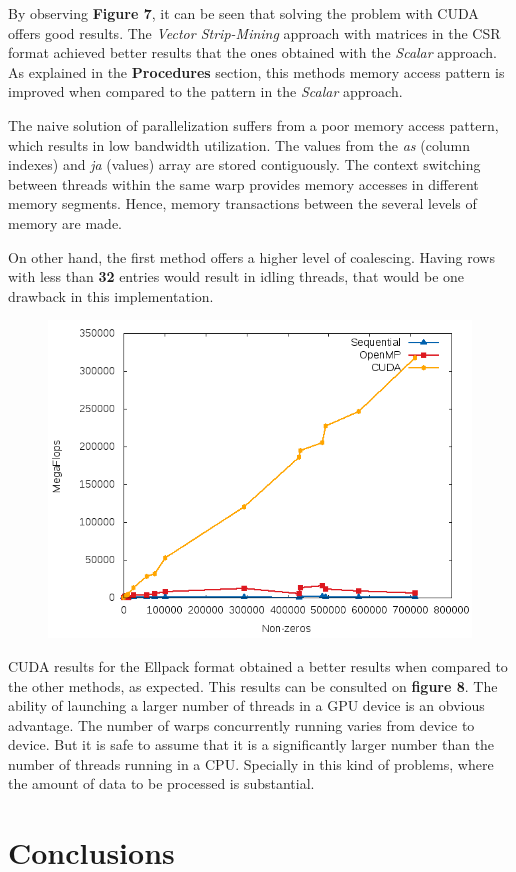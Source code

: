 \documentclass[12pt]{article}
\begin{document}
\par By observing \textbf{Figure 7}, it can be seen that solving the problem with CUDA offers good results. The \textit{Vector Strip-Mining} approach with matrices in the CSR format achieved better results that the ones obtained with the \textit{Scalar} approach. As explained in the \textbf{Procedures} section, this methods memory access pattern is improved when compared to the pattern in the \textit{Scalar} approach.
\par The naive solution of parallelization suffers from a poor memory access pattern, which results in low bandwidth utilization. The values from the \textit{as} (column indexes) and \textit{ja} (values) array are stored contiguously. The context switching between threads within the same warp provides memory accesses in different memory segments. Hence, memory transactions between the several levels of memory are made. 
\par On other hand, the first method offers a higher level of coalescing. Having rows with less than \textbf{32} entries would result in idling threads, that would be one drawback in this implementation.

\begin{figure}[!htb]
 \centering
  \includegraphics[width=.4\linewidth]{ellpackcuda.png}
\end{figure}

\par CUDA results for the Ellpack format obtained a better results when compared to the other methods, as expected. This results can be consulted on \textbf{figure 8}. The ability of launching a larger number of threads in a GPU device is an obvious advantage. The number of warps concurrently running varies from device to device. But it is safe to assume that it is a significantly larger number than the number of threads running in a CPU. Specially in this kind of problems, where the amount of data to be processed is substantial.


\pagebreak
\section*{Conclusions}
\end{document}

